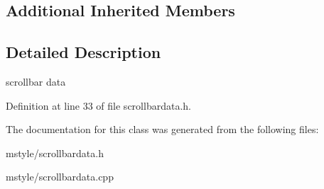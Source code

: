 \subsection*{Additional Inherited Members}


\subsection{Detailed Description}
scrollbar data 

Definition at line 33 of file scrollbardata.\+h.



The documentation for this class was generated from the following files\+:\begin{DoxyCompactItemize}
\item 
mstyle/scrollbardata.\+h\item 
mstyle/scrollbardata.\+cpp\end{DoxyCompactItemize}
